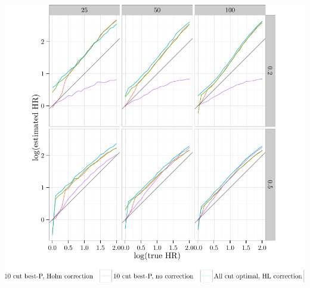 \documentclass{article}\usepackage[]{graphicx}\usepackage[]{color}
\makeatletter
\def\maxwidth{ %
  \ifdim\Gin@nat@width>\linewidth
    \linewidth
  \else
    \Gin@nat@width
  \fi
}
\newenvironment{knitrout}{}{} %
\makeatother
\begin{document}
\begin{knitrout}
{\centering \includegraphics[width=\maxwidth]{figure/02-exp1-plots-6} 

}



\end{knitrout}
\end{document}
